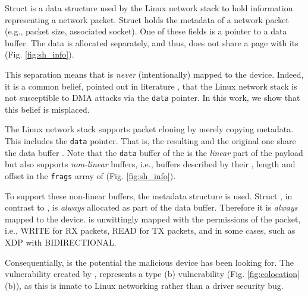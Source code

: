 Struct \skb{} is a data structure used by the Linux network stack to hold information representing a network packet. Struct \skb{} holds the metadata of a network packet (e.g., packet size, associated socket). One of these fields is a pointer to a data buffer. The data is allocated separately, and thus, does not share a page with its \skb{} (Fig. \ref{fig:sh_info}). 

This separation means that \skb{} is \emph{never} (intentionally) mapped to the device. Indeed, it is a common belief, pointed out in literature \cite{thunder}, that the Linux network stack is not susceptible to DMA attacks via the \texttt{data} pointer. In this work, we show that this belief is misplaced.

The Linux network stack supports packet cloning by merely copying \skb{} metadata. This includes the \texttt{data} pointer. That is, the resulting \skb{} and the original one share the data buffer \cite{drivers2005linux}. Note that the \texttt{data} buffer of the \skb{} is the \emph{linear} part of the payload but \skb{} also supports \emph{non-linear} buffers, i.e., buffers described by their \page{}, length and offset in the \texttt{frags} array of \shinfo{} (Fig. \ref{fig:sh_info}). 

To support these non-linear buffers, the \shinfo{} metadata structure is used.
Struct \shinfo{}, in contrast to \skb{}, is \emph{always} allocated as part of the data buffer. Therefore it is \emph{always} mapped to the device. \shinfo{} is unwittingly mapped with the permissions of the packet, i.e., WRITE for RX packets, READ for TX packets, and in some cases, such as XDP \cite{xdp} with BIDIRECTIONAL.

Consequentially, \shinfo{} is the potential \oportunity{} the malicious device has been looking for. The \subpage{} vulnerability created by \shinfo{}, represents a type (b) vulnerability (Fig. \ref{fig:colocation} (b)), as this is innate to Linux networking rather than a driver security bug. 

